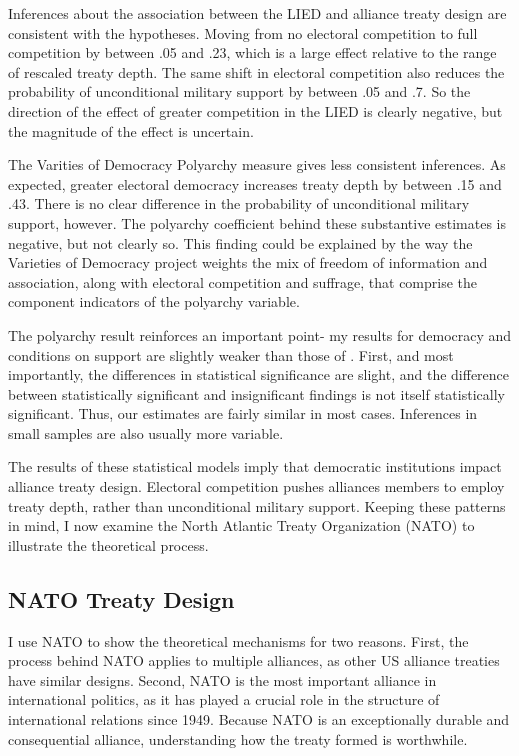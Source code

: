 \documentclass[12pt]{article}
\begin{document}
Inferences about the association between the LIED and alliance treaty design are consistent with the hypotheses.
Moving from no electoral competition to full competition by between .05 and .23, which is a large effect relative to the range of rescaled treaty depth. 
The same shift in electoral competition also reduces the probability of unconditional military support by between .05 and .7. 
So the direction of the effect of greater competition in the LIED is clearly negative, but the magnitude of the effect is uncertain. 


The Varities of Democracy Polyarchy measure gives less consistent inferences. 
As expected, greater electoral democracy increases treaty depth by between .15 and .43. 
There is no clear difference in the probability of unconditional military support, however.
The polyarchy coefficient behind these substantive estimates is negative, but not clearly so.  
This finding could be explained by the way the Varieties of Democracy project weights the mix of freedom of information and association, along with electoral competition and suffrage, that comprise the component indicators of the polyarchy variable.


The polyarchy result reinforces an important point- my results for democracy and conditions on support are slightly weaker than those of \citet{Chibaetal2015}. 
First, and most importantly, the differences in statistical significance are slight, and the difference between statistically significant and insignificant findings is not itself statistically significant. 
Thus, our estimates are fairly similar in most cases. 
Inferences in small samples are also usually more variable.


The results of these statistical models imply that democratic institutions impact alliance treaty design. 
Electoral competition pushes alliances members to employ treaty depth, rather than unconditional military support.  
Keeping these patterns in mind, I now examine the North Atlantic Treaty Organization (NATO) to illustrate the theoretical process. 


\subsection{NATO Treaty Design}


I use NATO to show the theoretical mechanisms for two reasons. 
First, the process behind NATO applies to multiple alliances, as other US alliance treaties have similar designs. 
Second, NATO is the most important alliance in international politics, as it has played a crucial role in the structure of international relations since 1949. 
Because NATO is an exceptionally durable and consequential alliance, understanding how the treaty formed is worthwhile. 
\end{document}

